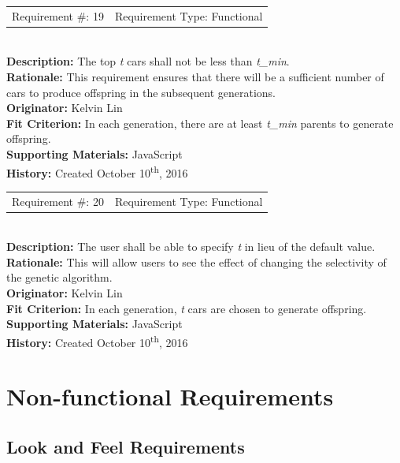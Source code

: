 \documentclass[12pt, titlepage]{article}
\begin{document}
\begin{reqbox}
%
\begin{tabular}{cc}
Requirement \#: 19 & Requirement Type: Functional \\
\end{tabular} \\
%
\textbf{Description:} The top \textit{t} cars shall not be less than 
\textit{t\_min}. \\
\textbf{Rationale:} This requirement ensures that there will be a sufficient 
number of cars to produce offspring in the subsequent generations. \\
\textbf{Originator:} Kelvin Lin\\
\textbf{Fit Criterion:} In each generation, there are at least \textit{t\_min} 
parents to generate offspring.\\
%  
\textbf{Supporting Materials:} JavaScript \\
\textbf{History:} Created October 10\textsuperscript{th}, 2016
%
\end{reqbox}

\begin{reqbox}
%
\begin{tabular}{cc}
Requirement \#: 20 & Requirement Type: Functional \\
\end{tabular} \\
%
\textbf{Description:} The user shall be able to specify \textit{t} in lieu of 
the default value. \\
\textbf{Rationale:} This will allow users to see the effect of changing the 
selectivity of the genetic algorithm. \\
\textbf{Originator:} Kelvin Lin\\
\textbf{Fit Criterion:} In each generation, \textit{t} cars are chosen to 
generate offspring. \\
%  
\textbf{Supporting Materials:} JavaScript \\
\textbf{History:} Created October 10\textsuperscript{th}, 2016
%
\end{reqbox}

\newpage


\section{Non-functional Requirements}

\subsection{Look and Feel Requirements}
\end{document}
